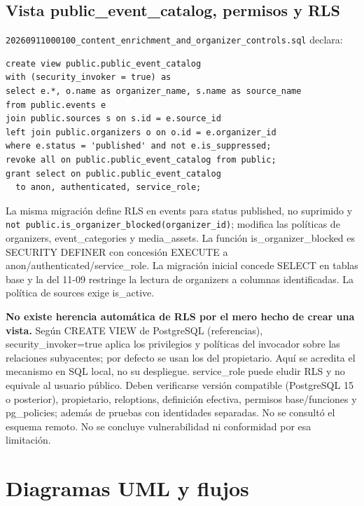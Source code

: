 \subsection{Vista public\_event\_catalog, permisos y RLS}
\nolinkurl{20260911000100_content_enrichment_and_organizer_controls.sql} declara:
\begin{minipage}{\linewidth}
\begin{lstlisting}
create view public.public_event_catalog
with (security_invoker = true) as
select e.*, o.name as organizer_name, s.name as source_name
from public.events e
join public.sources s on s.id = e.source_id
left join public.organizers o on o.id = e.organizer_id
where e.status = 'published' and not e.is_suppressed;
revoke all on public.public_event_catalog from public;
grant select on public.public_event_catalog
  to anon, authenticated, service_role;
\end{lstlisting}
\end{minipage}
La misma migración define RLS en events para status published, no suprimido y
\texttt{not public.is\_organizer\_blocked(organizer\_id)}; modifica las políticas de
organizers, event\_categories y media\_assets. La función is\_organizer\_blocked es
SECURITY DEFINER con concesión EXECUTE a anon/authenticated/service\_role.
La migración inicial concede SELECT en tablas base y la del 11-09 restringe la lectura
de organizers a columnas identificadas. La política de sources exige is\_active.

\textbf{No existe herencia automática de RLS por el mero hecho de crear una vista.}
Según CREATE VIEW de PostgreSQL (referencias), security\_invoker=true aplica los
privilegios y políticas del invocador sobre las relaciones subyacentes; por defecto
se usan los del propietario. Aquí se acredita el mecanismo en SQL local, no su despliegue.
service\_role puede eludir RLS y no equivale al usuario público. Deben verificarse versión
compatible (PostgreSQL 15 o posterior), propietario, reloptions, definición efectiva,
permisos base/funciones y pg\_policies; además de pruebas con identidades separadas.
No se consultó el esquema remoto. No se concluye vulnerabilidad ni conformidad por esa limitación.

\section{Diagramas UML y flujos}
\label{sec:uml}
